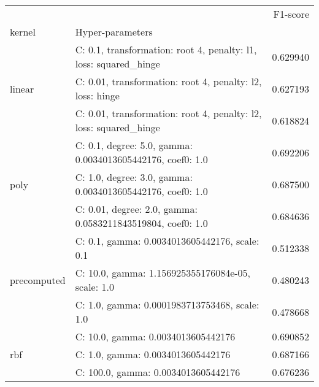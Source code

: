\begin{tabular}{llr}
\toprule
 &  & F1-score \\
kernel & Hyper-parameters &  \\
\midrule
\multirow[t]{3}{*}{linear} & C: 0.1, transformation: root 4, penalty: l1, loss: squared_hinge & 0.629940 \\
 & C: 0.01, transformation: root 4, penalty: l2, loss: hinge & 0.627193 \\
 & C: 0.01, transformation: root 4, penalty: l2, loss: squared_hinge & 0.618824 \\
\cline{1-3}
\multirow[t]{3}{*}{poly} & C: 0.1, degree: 5.0, gamma: 0.0034013605442176, coef0: 1.0 & 0.692206 \\
 & C: 1.0, degree: 3.0, gamma: 0.0034013605442176, coef0: 1.0 & 0.687500 \\
 & C: 0.01, degree: 2.0, gamma: 0.0583211843519804, coef0: 1.0 & 0.684636 \\
\cline{1-3}
\multirow[t]{3}{*}{precomputed} & C: 0.1, gamma: 0.0034013605442176, scale: 0.1 & 0.512338 \\
 & C: 10.0, gamma: 1.156925355176084e-05, scale: 1.0 & 0.480243 \\
 & C: 1.0, gamma: 0.0001983713753468, scale: 1.0 & 0.478668 \\
\cline{1-3}
\multirow[t]{3}{*}{rbf} & C: 10.0, gamma: 0.0034013605442176 & 0.690852 \\
 & C: 1.0, gamma: 0.0034013605442176 & 0.687166 \\
 & C: 100.0, gamma: 0.0034013605442176 & 0.676236 \\
\cline{1-3}
\bottomrule
\end{tabular}
